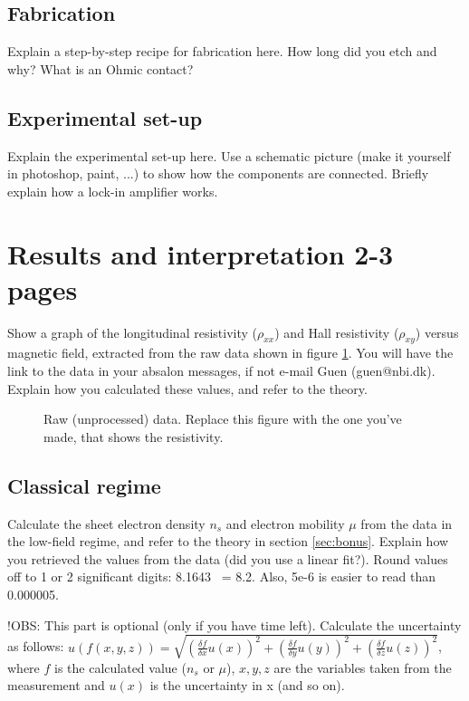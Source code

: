 \documentclass[a4paper]{article}
\begin{document}
      \subsection{Fabrication}
      Explain a step-by-step recipe for fabrication here. How long did you etch and why? What is an Ohmic contact?
      \subsection{Experimental set-up}
      Explain the experimental set-up here. Use a schematic picture (make it yourself in photoshop, paint, ...) to show how the components are connected. Briefly explain how a lock-in amplifier works.
      
      \newpage
      \section{Results and interpretation 2-3 pages}
      Show a graph of the longitudinal resistivity ($\rho_{xx}$) and Hall resistivity ($\rho_{xy}$) versus magnetic field, extracted from the raw data shown in figure \ref{fig:data}. You will have the link to the data in your absalon messages, if not e-mail Guen (guen@nbi.dk). Explain how you calculated these values, and refer to the theory.
      
      \begin{figure}
      \centering
      \caption{\label{fig:data}Raw (unprocessed) data. Replace this figure with the one you've made, that shows the resistivity.}
      \end{figure}
      
      \subsection{Classical regime}
      Calculate the sheet electron density $n_{s}$ and electron mobility $\mu$ from the data in the low-field regime, and refer to the theory in section \ref{sec:bonus}. Explain how you retrieved the values from the data (did you use a linear fit?).
      Round values off to 1 or 2 significant digits: 8.1643 ~= 8.2. Also, 5e-6 is easier to read than 0.000005.
      
      !OBS: This part is optional (only if you have time left).
      Calculate the uncertainty as follows: \newline $u(f(x, y, z)) = \sqrt{(\frac{\delta f}{\delta{x}} u(x))^{2} + (\frac{\delta f}{\delta{y}} u(y))^{2} + (\frac{\delta f}{\delta{z}} u(z))^{2}}$, where $f$ is the calculated value ($n_{s}$ or $\mu$), $x, y, z$ are the variables taken from the measurement and $u(x)$ is the uncertainty in x (and so on).
      
\end{document}
